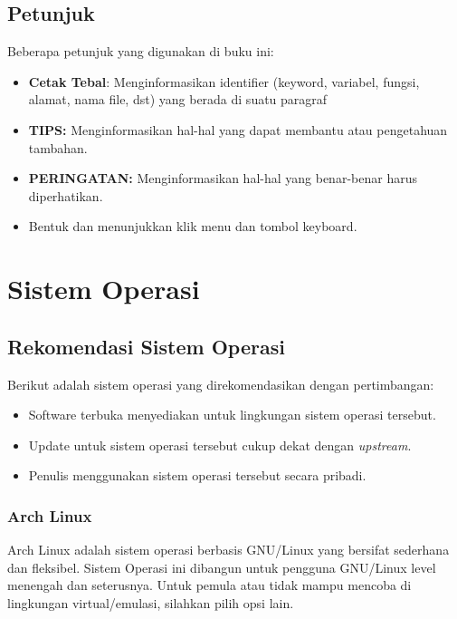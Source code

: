 \documentclass[12pt]{book}
\begin{document}
	\section{Petunjuk}
	Beberapa petunjuk yang digunakan di buku ini:
	\begin{itemize}
		\item \textbf{Cetak Tebal}: Menginformasikan identifier (keyword, variabel, fungsi, alamat, nama file, dst) yang berada di suatu paragraf
		\item \textbf{TIPS:} Menginformasikan hal-hal yang dapat membantu atau pengetahuan tambahan.
		\item \textbf{PERINGATAN:} Menginformasikan hal-hal yang benar-benar harus diperhatikan.
		\item Bentuk  dan  menunjukkan klik menu dan tombol keyboard.
	\end{itemize}
	
	
	\newpage
	\mainmatter
	\chapter{Sistem Operasi}
	
	\section{Rekomendasi Sistem Operasi}
	
	Berikut adalah sistem operasi yang direkomendasikan dengan pertimbangan:
	
	\begin{itemize}
		\item Software terbuka menyediakan untuk lingkungan sistem operasi tersebut.
		
		\item Update untuk sistem operasi tersebut cukup dekat dengan \textit{upstream}.
		
		\item Penulis menggunakan sistem operasi tersebut secara pribadi.
	\end{itemize}
	
	\subsection{Arch Linux}
	
	Arch Linux adalah sistem operasi berbasis GNU/Linux yang bersifat sederhana dan fleksibel.
	Sistem Operasi ini dibangun untuk pengguna GNU/Linux level menengah dan seterusnya.
	Untuk pemula atau tidak mampu mencoba di lingkungan virtual/emulasi, silahkan pilih opsi lain.
	
\end{document}
